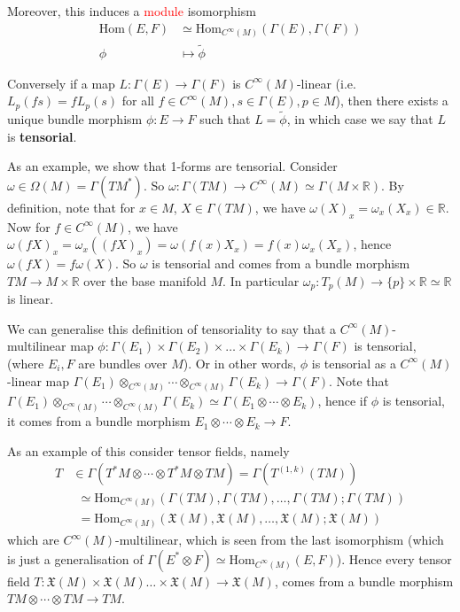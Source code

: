 \documentclass[a4paper]{article}
\theoremstyle{definition} \newtheorem*{definition}{Definition}
\theoremstyle{definition} \newtheorem*{definitions}{Definitions}
\theoremstyle{plain} \newtheorem{theorem}{Theorem}[section]
\theoremstyle{plain} \newtheorem{proposition}[theorem]{Proposition}
\theoremstyle{plain} \newtheorem{corollary}[theorem]{Corollary}
\theoremstyle{plain} \newtheorem{lemma}[theorem]{Lemma}
\theoremstyle{plain} \newtheorem{example}[theorem]{Example}
\newcommand{\checkCorrect}[1]{\textcolor{red}{#1}}
\newcommand{\defn}[1]{\textbf{#1}}
\newcommand{\realnos}{\mathbb{R}}
\newcommand{\Hom}{\text{Hom}}
\newcommand{\smooth}{C^\infty}
\begin{document}
Moreover, this induces a \checkCorrect{module} isomorphism 
\begin{align*}
\text{Hom}(E, F) & \simeq \text{Hom}_{C^\infty (M)}(\Gamma(E), \Gamma(F)) \\
\phi & \mapsto \tilde{\phi} 
\end{align*}

Conversely if a map $L:\Gamma(E)\to \Gamma(F)$ is $C^\infty(M)$-linear (i.e. $L_p(fs)=fL_p(s)$ for all $f\in C^\infty (M), s\in \Gamma(E), p\in M$), then there exists a unique bundle morphism $\phi:E\to F$ such that $L=\tilde{\phi}$, in which case we say that $L$ is \defn{tensorial}. 

As an example, we show that 1-forms are tensorial. Consider $\omega\in \Omega(M) = \Gamma(TM^*)$. So $\omega:\Gamma(TM)\to \smooth (M)\simeq \Gamma(M\times \realnos)$. By definition, note that for $x\in M$, $X\in \Gamma(TM)$, we have $\omega(X)_x = \omega_x(X_x)\in \realnos$. Now for $f\in \smooth(M)$, we have $\omega(fX)_x = \omega_x((fX)_x)= \omega(f(x)X_x) = f(x)\omega_x(X_x)$, hence $\omega(fX)=f \omega(X)$. So $\omega$ is tensorial and comes from a bundle morphism $TM\to M\times \realnos$ over the base manifold $M$. In particular $\omega_p:T_p(M)\to \{p\} \times \realnos \simeq \realnos$ is linear.  

We can generalise this definition of tensoriality to say that a $\smooth(M)$-multilinear map $\phi:\Gamma(E_1)\times \Gamma(E_2)\times \ldots \times \Gamma(E_k)\to \Gamma(F)$ is tensorial, (where $E_i, F$ are bundles over $M$). Or in other words, $\phi$ is tensorial as a $\smooth(M)$-linear map $\Gamma(E_1)\otimes_{\smooth(M)} \cdots \otimes_{\smooth(M)} \Gamma(E_k)\to \Gamma(F)$. Note that $\Gamma(E_1)\otimes_{\smooth(M)} \cdots \otimes_{\smooth(M)} \Gamma(E_k)\simeq \Gamma(E_1\otimes \cdots \otimes E_k)$, hence if $\phi$ is tensorial, it comes from a bundle morphism $E_1\otimes \cdots \otimes E_k\to F$.

As an example of this consider tensor fields, namely 
\begin{align*}
T & \in \Gamma(T^*M\otimes \cdots \otimes T^*M \otimes TM) = \Gamma(T^{(1, k)}(TM)) \\
& \ \ \simeq \text{Hom}_{\smooth(M)}(\Gamma(TM), \Gamma(TM), \ldots, \Gamma(TM); \Gamma(TM)) \\
& \ \ = \text{Hom}_{\smooth(M)}(\mathfrak{X}(M), \mathfrak{X}(M), \ldots, \mathfrak{X}(M); \mathfrak{X}(M))
\end{align*}
which are $\smooth(M)$-multilinear, which is seen from the last isomorphism (which is just a generalisation of $\Gamma(E^*\otimes F)\simeq \Hom_{\smooth (M)}(E, F)$). Hence every tensor field  $T:\mathfrak{X}(M)\times \mathfrak{X}(M) \ldots \times \mathfrak{X}(M)\to \mathfrak{X}(M)$, comes from a bundle morphism $TM\otimes \cdots \otimes TM\to TM$.
\end{document}
